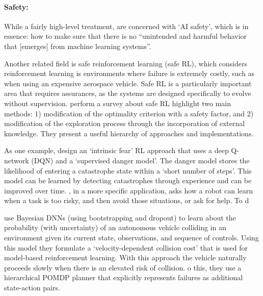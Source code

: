 \paragraph{Safety:}
While a fairly high-level treatment, \citet{Amodei2016-xi} are concerned with `AI safety', which is in essence: how to make sure that there is no ``unintended and harmful behavior that [emerges] from machine learning systems''.

Another related field is safe reinforcement learning (safe RL), which considers reinforcement learning is environments where failure is extremely costly, such as when using an expensive aerospace vehicle. Safe RL is a particularly important area that requires assurances, as the systems are designed specifically to evolve without supervision. \citet{Garcia2015-rs} perform a survey about safe RL highlight two main methods: 1) modification of the optimality criterion with a safety factor, and 2) modification of the exploration process through the incorporation of external knowledge. They present a useful hierarchy of approaches and implementations.

As one example, \citet{Lipton2016-dq} design an `intrinsic fear' RL approach that uses a deep Q-network (DQN) and a `supervised danger model'. The danger model stores the likelihood of entering a catastrophe state within a `short number of steps'. This model can be learned by detecting catastrophes through experience and can be improved over time. \citet{Curran2016-ij}, in a more specific application, asks how a robot can learn when a task is too risky, and then avoid those situations, or ask for help. To d

\citet{Kahn2017-vy} use Bayesian DNNs (using bootstrapping and dropout) to learn about the probability (with uncertainty) of an autonomous vehicle colliding in an environment given its current state, observations, and sequence of controls. Using this model they formulate a `velocity-dependent collision cost' that is used for model-based reinforcement learning. With this approach the vehicle naturally proceeds slowly when there is an elevated risk of collision. o this, they use a hierarchical POMDP planner that explicitly represents failures as additional state-action pairs.

